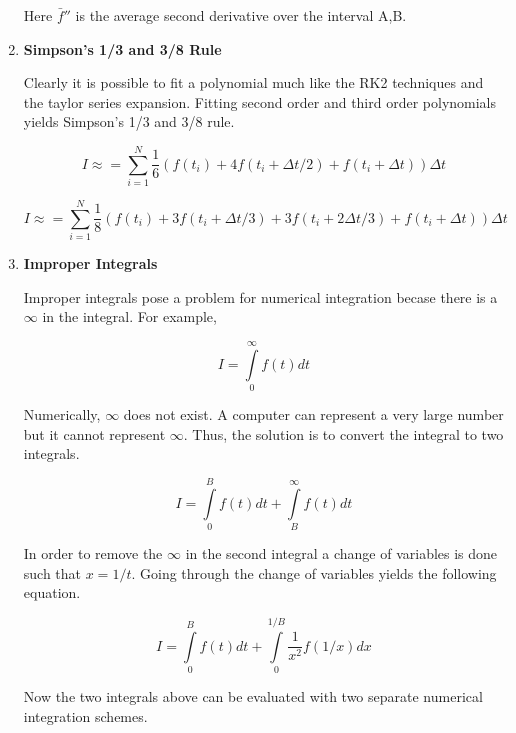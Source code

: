 \begin{enumerate}
  Here $\bar{f}''$ is the average second derivative over the interval
  A,B.

  \item {\bf Simpson's 1/3 and 3/8 Rule}
    
    Clearly it is possible to fit a polynomial much like the RK2
    techniques and the taylor series expansion. Fitting second order
    and third order polynomials yields Simpson's 1/3 and 3/8 rule.

    \begin{equation}
      I \approx = \sum\limits_{i=1}^N \frac{1}6 (f(t_i) + 4
      f(t_i+\Delta t/2) + f(t_i + \Delta t))\Delta t
    \end{equation}

    \begin{equation}
      I \approx = \sum\limits_{i=1}^N \frac{1}8 (f(t_i) + 3
      f(t_i+\Delta t/3) + 3f(t_i+2\Delta t/3) + f(t_i + \Delta t))\Delta t
    \end{equation}
    
  \item {\bf Improper Integrals}

    Improper integrals pose a problem for numerical integration becase
    there is a $\infty$ in the integral. For example,

    \begin{equation}
      I = \int\limits_{0}^{\infty}f(t)dt
    \end{equation}

    Numerically, $\infty$ does not exist. A computer can represent a
    very large number but it cannot represent $\infty$. Thus, the
    solution is to convert the integral to two integrals.

    \begin{equation}
      I = \int\limits_{0}^{B}f(t)dt + \int\limits_{B}^{\infty}f(t)dt
    \end{equation}

    In order to remove the $\infty$ in the second integral a change of
    variables is done such that $x=1/t$. Going through the change of
    variables yields the following equation.
    
    \begin{equation}
      I = \int\limits_{0}^{B}f(t)dt + \int\limits_{0}^{1/B}\frac{1}{x^2}f(1/x)dx
    \end{equation}

    Now the two integrals above can be evaluated with two separate
    numerical integration schemes.

\end{enumerate}
